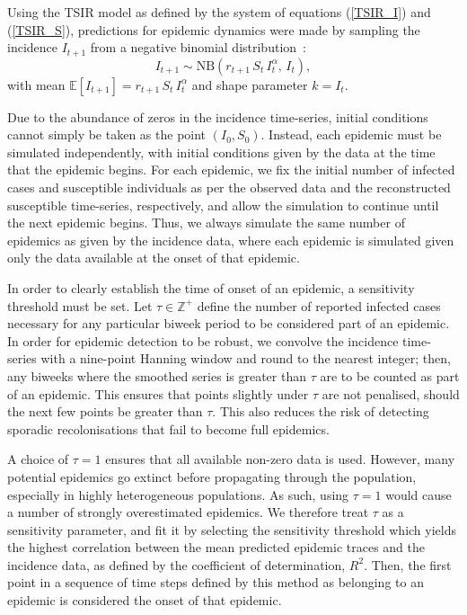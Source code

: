 \documentclass[10pt]{article}
\begin{document}
Using the TSIR model as defined by the system of equations (\ref{TSIR_I}) and (\ref{TSIR_S}), predictions for epidemic dynamics were made by sampling the incidence $I_{t+1}$ from a negative binomial distribution~:
\begin{equation}
I_{t+1} \sim \mathrm{NB}\left(r_{t+1}\,S_t\,I_t^\alpha, \, I_t\right),
\end{equation}
with mean $\mathbb{E}\left[I_{t+1}\right] = r_{t+1} \, S_t \, I_t^\alpha$ and shape parameter $k = I_t$.

Due to the abundance of zeros in the incidence time-series, initial conditions cannot simply be taken as the point $\left(I_0, S_0\right)$. Instead, each epidemic must be simulated independently, with initial conditions given by the data at the time that the epidemic begins. For each epidemic, we fix the initial number of infected cases and susceptible individuals as per the observed data and the reconstructed susceptible time-series, respectively, and allow the simulation to continue until the next epidemic begins. Thus, we always simulate the same number of epidemics as given by the incidence data, where each epidemic is simulated given only the data available at the onset of that epidemic. 

In order to clearly establish the time of onset of an epidemic, a sensitivity threshold must be set. Let $\tau \in \mathbb{Z}^+$ define the number of reported infected cases necessary for any particular biweek period to be considered part of an epidemic. In order for epidemic detection to be robust, we convolve the incidence time-series with a nine-point Hanning window and round to the nearest integer; then, any biweeks where the smoothed series is greater than $\tau$ are to be counted as part of an epidemic. This ensures that points slightly under $\tau$ are not penalised, should the next few points be greater than $\tau$. This also reduces the risk of detecting sporadic recolonisations that fail to become full epidemics.

A choice of $\tau = 1$ ensures that all available non-zero data is used. However, many potential epidemics go extinct before propagating through the population, especially in highly heterogeneous populations. As such, using $\tau=1$ would cause a number of strongly overestimated epidemics. We therefore treat $\tau$ as a sensitivity parameter, and fit it by selecting the sensitivity threshold which yields the highest correlation between the mean predicted epidemic traces and the incidence data, as defined by the coefficient of determination, $R^2$. Then, the first point in a sequence of time steps defined by this method as belonging to an epidemic is considered the onset of that epidemic.
\end{document}
